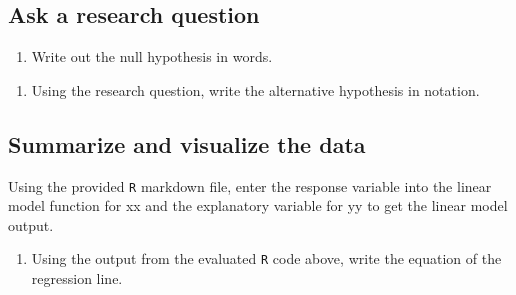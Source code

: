\documentclass[
]{report}
\newenvironment{Shaded}{\begin{snugshade}}{\end{snugshade}}
\newcommand{\CommentTok}[1]{\textcolor[rgb]{0.56,0.35,0.01}{\textit{#1}}}
\newcommand{\DataTypeTok}[1]{\textcolor[rgb]{0.13,0.29,0.53}{#1}}
\newcommand{\KeywordTok}[1]{\textcolor[rgb]{0.13,0.29,0.53}{\textbf{#1}}}
\newcommand{\NormalTok}[1]{#1}
\newcommand{\OperatorTok}[1]{\textcolor[rgb]{0.81,0.36,0.00}{\textbf{#1}}}
\newcommand{\StringTok}[1]{\textcolor[rgb]{0.31,0.60,0.02}{#1}}
\providecommand{\tightlist}{%
  \setlength{\itemsep}{0pt}\setlength{\parskip}{0pt}}
\begin{document}
\vspace{1in}

\newpage

\hypertarget{ask-a-research-question}{%
\subsection*{Ask a research question}\label{ask-a-research-question}}

\begin{enumerate}
\def\labelenumi{\arabic{enumi}.}
\setcounter{enumi}{5}
\tightlist
\item
  Write out the null hypothesis in words.
\end{enumerate}

\vspace{1in}

\begin{enumerate}
\def\labelenumi{\arabic{enumi}.}
\setcounter{enumi}{6}
\tightlist
\item
  Using the research question, write the alternative hypothesis in notation.
\end{enumerate}

\vspace{0.5in}

\hypertarget{summarize-and-visualize-the-data}{%
\subsection*{Summarize and visualize the data}\label{summarize-and-visualize-the-data}}

Using the provided \texttt{R} markdown file, enter the response variable into the linear model function for xx and the explanatory variable for yy to get the linear model output.

\begin{Shaded}
\end{Shaded}

\begin{enumerate}
\def\labelenumi{\arabic{enumi}.}
\setcounter{enumi}{7}
\tightlist
\item
  Using the output from the evaluated \texttt{R} code above, write the equation of the regression line.
\end{enumerate}
\end{document}
